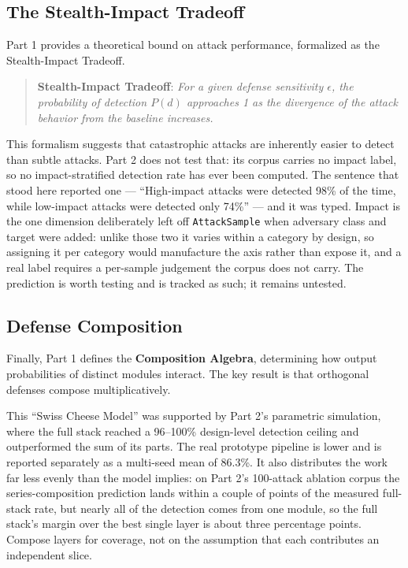 \documentclass[
]{article}
\begin{document}
\subsection{The Stealth-Impact
Tradeoff}\label{sec:stealth-impact-review}

Part 1 provides a theoretical bound on attack performance, formalized as
the Stealth-Impact Tradeoff.

\begin{quote}
\textbf{Stealth-Impact Tradeoff}: \emph{For a given defense sensitivity
\(\epsilon\), the probability of detection \(P(d)\) approaches 1 as the
divergence of the attack behavior from the baseline increases.}
\end{quote}

This formalism suggests that catastrophic attacks are inherently easier
to detect than subtle attacks. Part 2 does not test that: its corpus
carries no impact label, so no impact-stratified detection rate has ever
been computed. The sentence that stood here reported one ---
``High-impact attacks were detected 98\% of the time, while low-impact
attacks were detected only 74\%'' --- and it was typed. Impact is the
one dimension deliberately left off \texttt{AttackSample} when adversary
class and target were added: unlike those two it varies within a
category by design, so assigning it per category would manufacture the
axis rather than expose it, and a real label requires a per-sample
judgement the corpus does not carry. The prediction is worth testing and
is tracked as such; it remains untested.

\subsection{Defense Composition}\label{sec:composition-review}

Finally, Part 1 defines the \textbf{Composition Algebra}, determining
how output probabilities of distinct modules interact. The key result is
that orthogonal defenses compose multiplicatively.

This ``Swiss Cheese Model'' was supported by Part 2's parametric
simulation, where the full stack reached a 96--100\% design-level
detection ceiling and outperformed the sum of its parts. The real
prototype pipeline is lower and is reported separately as a multi-seed
mean of 86.3\%. It also distributes the work far less evenly than the
model implies: on Part 2's 100-attack ablation corpus the
series-composition prediction lands within a couple of points of the
measured full-stack rate, but nearly all of the detection comes from one
module, so the full stack's margin over the best single layer is about
three percentage points. Compose layers for coverage, not on the
assumption that each contributes an independent slice.
\end{document}
